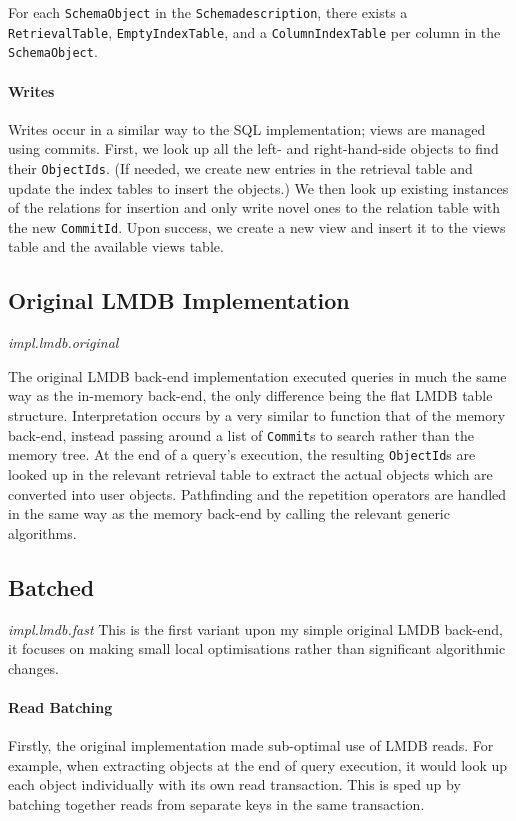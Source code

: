 \documentclass[12pt,a4paper,twoside,openright]{report}
\newcommand\codeName[1]{\texttt{#1}}
\newcommand\note[1]{\textit{#1}}
\begin{document}
For each \codeName{SchemaObject} in the \codeName{Schemadescription}, there exists a \codeName{RetrievalTable}, \codeName{EmptyIndexTable}, and a \codeName{ColumnIndexTable} per column in the \codeName{SchemaObject}.
		
		
		\paragraph{Writes}
		Writes occur in a similar way to the SQL implementation; views are managed using commits. First, we look up all the left- and right-hand-side objects to find their \codeName{ObjectIds}. (If needed, we create new entries in the retrieval table and update the index tables to insert the objects.) We then look up existing instances of the relations for insertion and only write novel ones to the relation table with the new \codeName{CommitId}. Upon success, we create a new view and insert it to the views table and the available views table.

	\subsection{Original LMDB Implementation}
	\note{impl.lmdb.original}

The original LMDB back-end implementation executed queries in much the same way as the in-memory back-end, the only difference being the flat LMDB table structure. Interpretation occurs by a very similar to function that of the memory back-end, instead passing around a list of \codeName{Commit}s to search rather than the memory tree. At the end of a query's execution, the resulting \codeName{ObjectId}s are looked up in the relevant retrieval table to extract the actual objects which are converted into user objects. Pathfinding and the repetition operators are handled in the same way as the memory back-end by calling the relevant generic algorithms.
 

	\subsection{Batched}
	\note{impl.lmdb.fast}
	This is the first variant upon my simple original LMDB back-end, it focuses on making small local optimisations rather than significant algorithmic changes.
	
		\paragraph{Read Batching}
		Firstly, the original implementation made sub-optimal use of LMDB reads. For example, when extracting objects at the end of query execution, it would look up each object individually with its own read transaction. This is sped up by batching together reads from separate keys in the same transaction.
		
\end{document}
